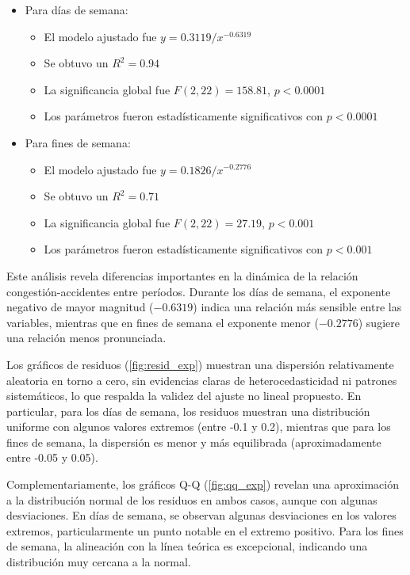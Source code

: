 \documentclass[12pt]{article}
\begin{document}
\begin{itemize}
    \item Para días de semana:
    \begin{itemize}
        \item El modelo ajustado fue $y = 0.3119/x^{-0.6319}$
        \item Se obtuvo un $R^2 = 0.94$
        \item La significancia global fue $F(2, 22) = 158.81$, $p < 0.0001$
        \item Los parámetros fueron estadísticamente significativos con $p < 0.0001$
    \end{itemize}

    \item Para fines de semana:
    \begin{itemize}
        \item El modelo ajustado fue $y = 0.1826/x^{-0.2776}$
        \item Se obtuvo un $R^2 = 0.71$
        \item La significancia global fue $F(2, 22) = 27.19$, $p < 0.001$
        \item Los parámetros fueron estadísticamente significativos con $p < 0.001$
    \end{itemize}
\end{itemize}

Este análisis revela diferencias importantes en la dinámica de la relación congestión-accidentes entre períodos. Durante los días de semana, el exponente negativo de mayor magnitud ($-0.6319$) indica una relación más sensible entre las variables, mientras que en fines de semana el exponente menor ($-0.2776$) sugiere una relación menos pronunciada.

Los gráficos de residuos (\cref{fig:resid_exp}) muestran una dispersión relativamente aleatoria en torno a cero, sin evidencias claras de heterocedasticidad ni patrones sistemáticos, lo que respalda la validez del ajuste no lineal propuesto. En particular, para los días de semana, los residuos muestran una distribución uniforme con algunos valores extremos (entre -0.1 y 0.2), mientras que para los fines de semana, la dispersión es menor y más equilibrada (aproximadamente entre -0.05 y 0.05).

Complementariamente, los gráficos Q-Q (\cref{fig:qq_exp}) revelan una aproximación a la distribución normal de los residuos en ambos casos, aunque con algunas desviaciones. En días de semana, se observan algunas desviaciones en los valores extremos, particularmente un punto notable en el extremo positivo. Para los fines de semana, la alineación con la línea teórica es excepcional, indicando una distribución muy cercana a la normal.
\end{document}

